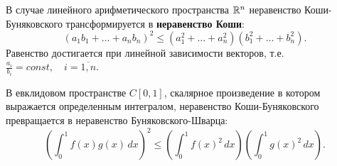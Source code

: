 \begin{corollary}
    В случае линейного арифметического пространства $\mathbb{R}^n$ неравенство Коши-Буняковского трансформируется в \textbf{неравенство Коши}:
    $$(a_1b_1 + \ldots + a_nb_n)^2 \leq (a_1^2 + \ldots + a_n^2)(b_1^2 + \ldots + b_n^2).$$
    Равенство достигается при линейной зависимости векторов, т.е. $\frac{a_i}{b_i} = const, \quad i = \overline{1, n}$.
\end{corollary}

\begin{corollary}
    В евклидовом пространстве $C[0, 1]$, скалярное произведение в котором выражается определенным интегралом, неравенство Коши-Буняковского превращается в неравенство Буняковского-Шварца:
    $$\left( \int_0^1 f(x)g(x) \, dx \right)^2 \le \left( \int_0^1 f(x)^2 \, dx \right) \left( \int_0^1 g(x)^2 \, dx \right).$$
\end{corollary}
